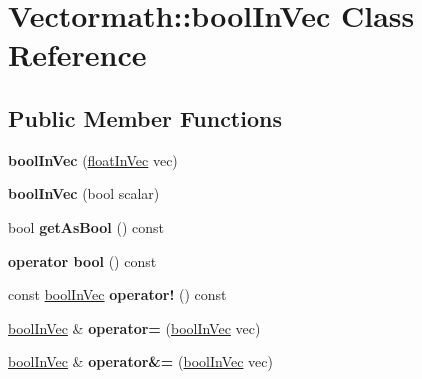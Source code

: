 \hypertarget{class_vectormath_1_1bool_in_vec}{\section{Vectormath\+:\+:bool\+In\+Vec Class Reference}
\label{class_vectormath_1_1bool_in_vec}
}
\subsection*{Public Member Functions}
\begin{DoxyCompactItemize}
\item 
\hypertarget{class_vectormath_1_1bool_in_vec_aa21ebe5fd4b82622482071def03bf027}{{\bfseries bool\+In\+Vec} (\hyperlink{class_vectormath_1_1float_in_vec}{float\+In\+Vec} vec)}\label{class_vectormath_1_1bool_in_vec_aa21ebe5fd4b82622482071def03bf027}

\item 
\hypertarget{class_vectormath_1_1bool_in_vec_a4f28ddfcc232b287446eb659b2c5f326}{{\bfseries bool\+In\+Vec} (bool scalar)}\label{class_vectormath_1_1bool_in_vec_a4f28ddfcc232b287446eb659b2c5f326}

\item 
\hypertarget{class_vectormath_1_1bool_in_vec_a817030f4550f00989173939aaafb5958}{bool {\bfseries get\+As\+Bool} () const }\label{class_vectormath_1_1bool_in_vec_a817030f4550f00989173939aaafb5958}

\item 
\hypertarget{class_vectormath_1_1bool_in_vec_a258f20bcd56f284843a5e4a0964af02a}{{\bfseries operator bool} () const }\label{class_vectormath_1_1bool_in_vec_a258f20bcd56f284843a5e4a0964af02a}

\item 
\hypertarget{class_vectormath_1_1bool_in_vec_aba21c8c76cb386b1d6b2c38cdabd2336}{const \hyperlink{class_vectormath_1_1bool_in_vec}{bool\+In\+Vec} {\bfseries operator!} () const }\label{class_vectormath_1_1bool_in_vec_aba21c8c76cb386b1d6b2c38cdabd2336}

\item 
\hypertarget{class_vectormath_1_1bool_in_vec_a2c50cda65cc64eb8a72ccab7fc4ad88d}{\hyperlink{class_vectormath_1_1bool_in_vec}{bool\+In\+Vec} \& {\bfseries operator=} (\hyperlink{class_vectormath_1_1bool_in_vec}{bool\+In\+Vec} vec)}\label{class_vectormath_1_1bool_in_vec_a2c50cda65cc64eb8a72ccab7fc4ad88d}

\item 
\hypertarget{class_vectormath_1_1bool_in_vec_a2a14f17fa25b360c5984c491d121f446}{\hyperlink{class_vectormath_1_1bool_in_vec}{bool\+In\+Vec} \& {\bfseries operator\&=} (\hyperlink{class_vectormath_1_1bool_in_vec}{bool\+In\+Vec} vec)}\label{class_vectormath_1_1bool_in_vec_a2a14f17fa25b360c5984c491d121f446}


\end{DoxyCompactItemize}
